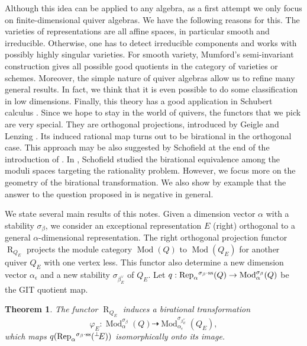 \documentclass{amsart}
\newtheorem{theorem}{Theorem}[section]
\theoremstyle{definition}
\theoremstyle{remark}
\numberwithin{equation}{section}
\begin{document}
Although this idea can be applied to any algebra, as a first attempt we only focus on finite-dimensional quiver algebras. We have the following reasons for this. The varieties of representations are all affine spaces, in particular smooth and irreducible. Otherwise, one has to detect irreducible components and works with possibly highly singular varieties. For smooth variety, Mumford's semi-invariant construction gives all possible good quotients in the category of varieties or schemes. Moreover, the simple nature of quiver algebras allow us to refine many general results. In fact, we think that it is even possible to do some classification in low dimensions. Finally, this theory has a good application in Schubert calculus \cite[Section 7]{DW2}. Since we hope to stay in the world of quivers, the functors that we pick are very special. They are orthogonal projections, introduced by Geigle and Lenzing \cite{GL}. Its induced rational map turns out to be birational in the orthogonal case. This approach may be also suggested by Schofield at the end of the introduction of \cite{S3}. In \cite{S3}, Schofield studied the birational equivalence among the moduli spaces targeting the rationality problem. However, we focus more on the geometry of the birational transformation. We also show by example that the answer to the question proposed in \cite[Introduction]{S3} is negative in general.

We state several main results of this notes. Given a dimension vector $\alpha$ with a stability $\sigma_\beta$, we consider an exceptional representation $E$ (right) orthogonal to a general $\alpha$-dimensional representation. The right orthogonal projection functor ${\operatorname{R}}_{Q_E}$ projects the module category ${\operatorname{Mod}}(Q)$ to ${\operatorname{Mod}}(Q_E)$ for another quiver $Q_E$ with one vertex less. This functor also determine a new dimension vector $\alpha_\epsilon$ and a new stability $\sigma_{\beta_E^\vee}$ of $Q_E$. Let $q: {\operatorname{Rep}}_\alpha{^{\sigma_{{\beta}}\cdot{\rm {ss}}}}(Q)\to {\operatorname{Mod}}_\alpha^{\sigma_\beta}(Q)$ be the GIT quotient map.
\begin{theorem} The functor ${\operatorname{R}}_{Q_E}$ induces a birational transformation $$\varphi_E:{\operatorname{Mod}}_\alpha^{\sigma_\beta}(Q)\dashrightarrow{\operatorname{Mod}}_{\alpha_\epsilon}^{\sigma_{\beta_E^\vee}}(Q_E),$$
which maps $q({\operatorname{Rep}}_\alpha{^{\sigma_{{\beta}}\cdot{\rm {ss}}}}({{^\perp}\!} E))$ isomorphically onto its image.
\end{theorem}
\end{document}
